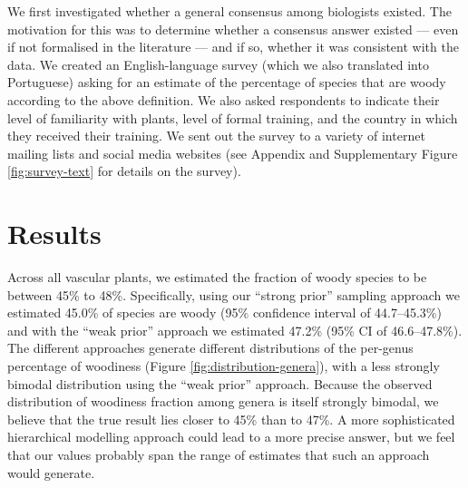 \documentclass[a4paper,12pt]{article}
\begin{document}
%
%
%


We first investigated whether a general consensus among biologists
existed.  The motivation for this was to determine whether a consensus
answer existed --- even if not formalised in the literature --- and if
so, whether it was consistent with the data.
% 
We created an English-language survey (which we also translated into Portuguese) 
asking for an estimate of the
percentage of species that are woody according to the above
definition.  We also asked respondents to indicate their level of
familiarity with plants, level of formal training, and the country in
which they received their training. We sent out the survey to a variety of internet mailing lists 
and social media websites
(see Appendix and Supplementary Figure
\ref{fig:survey-text} for details on the survey). 

\section{Results}

Across all vascular plants, we estimated the fraction of woody species
to be between 45\% to 48\%.
Specifically, using our ``strong prior'' sampling approach we
estimated 45.0\% of species are woody (95\% confidence interval of
44.7--45.3\%) and with the ``weak prior'' approach we estimated 47.2\%
(95\% CI of 46.6--47.8\%).
The different approaches generate different distributions of the
per-genus percentage of woodiness (Figure
\ref{fig:distribution-genera}), with a less strongly bimodal
distribution using the ``weak prior'' approach.
%
Because the observed distribution of woodiness fraction among genera
is itself strongly bimodal, we believe that the true result lies
closer to 45\% than to 47\%.  A more sophisticated hierarchical
modelling approach could lead to a more precise answer, but we feel
that our values probably span the range of estimates that such an
approach would generate.
\end{document}
